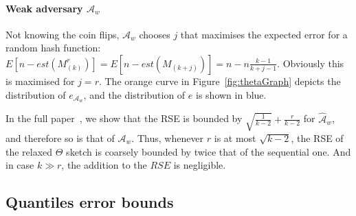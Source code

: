 \paragraph{Weak adversary ${\mathcal{A}}_w$} Not knowing the coin flips, ${\mathcal{A}}_w$ chooses $j$
that maximises the expected error for a random hash function:
$E[n-est(M^r_{(k)})]=E[n-est(M_{(k+j)})]=n-n\frac{k-1}{k+j-1}$. Obviously this
is maximised for $j=r$. The orange curve in Figure~\ref{fig:thetaGraph} depicts
the distribution of $e_{{\mathcal{A}}_w}$, and the distribution of $e$ is shown in blue.



In the full paper~\cite{rinberg2019fast},
we show that the RSE
is bounded by $\sqrt{\frac{1}{k-2}} + \frac{r}{k-2}$ for $\hat{{\mathcal{A}}}_w$, and therefore so
is that of ${\mathcal{A}}_w$.
Thus, whenever $r$ is at most $\sqrt{k-2}$, the RSE of the relaxed
$\Theta$ sketch is coarsely bounded by
twice that of the sequential one. And in case $k \gg r$, the addition to the $RSE$ is negligible.

\subsection{Quantiles error bounds}
\label{ssec:quantiles-error-analysis}

